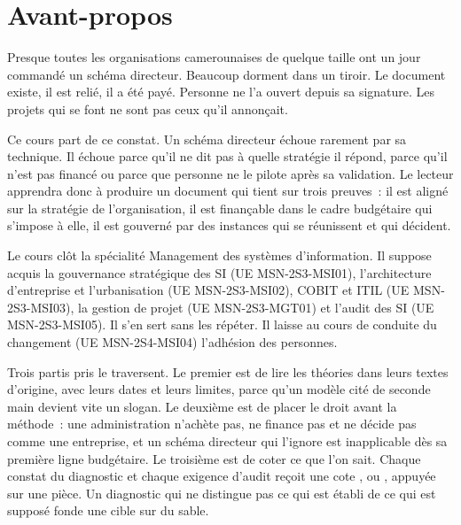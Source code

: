 
\chapter*{Avant-propos}

Presque toutes les organisations camerounaises de quelque taille ont un jour
commandé un schéma directeur. Beaucoup dorment dans un tiroir. Le document
existe, il est relié, il a été payé. Personne ne l'a ouvert depuis sa
signature. Les projets qui se font ne sont pas ceux qu'il annonçait.

Ce cours part de ce constat. Un schéma directeur échoue rarement par sa
technique. Il échoue parce qu'il ne dit pas à quelle stratégie il répond,
parce qu'il n'est pas financé ou parce que personne ne le pilote après sa
validation. Le lecteur apprendra donc à produire un document qui tient sur
trois preuves~: il est aligné sur la stratégie de l'organisation, il est
finançable dans le cadre budgétaire qui s'impose à elle, il est gouverné par
des instances qui se réunissent et qui décident.

Le cours clôt la spécialité Management des systèmes d'information. Il
suppose acquis la gouvernance stratégique des SI (UE MSN-2S3-MSI01),
l'architecture d'entreprise et l'urbanisation (UE MSN-2S3-MSI02), COBIT et
ITIL (UE MSN-2S3-MSI03), la gestion de projet (UE MSN-2S3-MGT01) et l'audit
des SI (UE MSN-2S3-MSI05). Il s'en sert sans les répéter. Il laisse au cours
de conduite du changement (UE MSN-2S4-MSI04) l'adhésion des personnes.

Trois partis pris le traversent. Le premier est de lire les théories dans
leurs textes d'origine, avec leurs dates et leurs limites, parce qu'un modèle
cité de seconde main devient vite un slogan. Le deuxième est de placer le
droit avant la méthode~: une administration n'achète pas, ne finance pas et
ne décide pas comme une entreprise, et un schéma directeur qui l'ignore est
inapplicable dès sa première ligne budgétaire. Le troisième est de coter ce
que l'on sait. Chaque constat du diagnostic et chaque exigence d'audit reçoit
une cote \OUI{}, \NON{} ou \NEK{}, appuyée sur une pièce. Un diagnostic qui
ne distingue pas ce qui est établi de ce qui est supposé fonde une cible sur
du sable.

